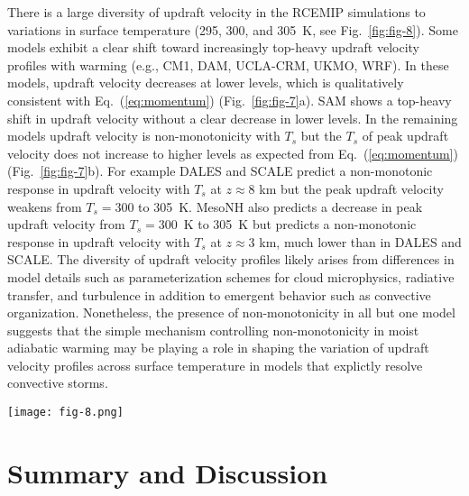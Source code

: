 \documentclass[draft,twocol]{ametsocV6.1}
\begin{document}
There is a large diversity of updraft velocity in the RCEMIP simulations to variations in surface temperature (295, 300, and 305~K, see Fig.~\ref{fig:fig-8}). Some models exhibit a clear shift toward increasingly top-heavy updraft velocity profiles with warming (e.g., CM1, DAM, UCLA-CRM, UKMO, WRF). In these models, updraft velocity decreases at lower levels, which is qualitatively consistent with Eq.~(\ref{eq:momentum}) (Fig.~\ref{fig:fig-7}a). SAM shows a top-heavy shift in updraft velocity without a clear decrease in lower levels. In the remaining models updraft velocity is non-monotonicity with $T_s$ but the $T_s$ of peak updraft velocity does not increase to higher levels as expected from Eq.~(\ref{eq:momentum}) (Fig.~\ref{fig:fig-7}b). For example DALES and SCALE predict a non-monotonic response in updraft velocity with $T_s$ at $z\approx8$ km but the peak updraft velocity weakens from $T_s=300$ to 305~K. MesoNH also predicts a decrease in peak updraft velocity from $T_s=300$~K to 305~K but predicts a non-monotonic response in updraft velocity with $T_s$ at $z\approx3$ km, much lower than in DALES and SCALE. The diversity of updraft velocity profiles likely arises from differences in model details such as parameterization schemes for cloud microphysics, radiative transfer, and turbulence in addition to emergent behavior such as convective organization. Nonetheless, the presence of non-monotonicity in all but one model suggests that the simple mechanism controlling non-monotonicity in moist adiabatic warming may be playing a role in shaping the variation of updraft velocity profiles across surface temperature in models that explictly resolve convective storms.

\begin{figure*}[htbp]
 \centering
 \texttt{[image: fig-8.png]}\\
 \caption{Updraft velocity from 9 cloud-resolving models (CM1, DALES, DAM, MesoNH, SAM-CRM, SCALE, UCLA-CRM, UKMO-CASIM, and WRF) that participated in RCEMIP \citep{wing2018}. The simulations are on a 100~km $\times$ 100~km periodic domain for uniform sea surface temperatures set to 295 (blue), 300 (black), and 305~K (red). Updraft velocity at each level is the mean of vertical velocities $w$ that exceed the 99.9th percentile ($w_{>99.9}$).}\label{fig:fig-8}
\end{figure*}

\section{Summary and Discussion}
\end{document}
